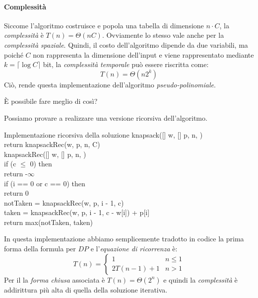 \paragraph{Complessità}
Siccome l'algoritmo costruisce e popola una tabella di dimensione $n\cdot C$,
la \emph{complessità} è $T(n)=\Theta(nC)$. Ovviamente lo stesso vale anche per 
la \emph{complessità spaziale}. Quindi, il costo dell'algoritmo dipende da due
variabili, ma poiché $C$ non rappresenta la dimensione dell'input e viene
rappresentato mediante $k=\lceil\log C\rceil$ bit, la \emph{complessità
temporale} può essere riscritta come:
\[T(n)=\Theta(n2^k)\]
Ciò, rende questa implementazione dell'algoritmo \emph{pseudo-polinomiale}\footnotemark.


\bigskip\noindent
È possibile fare meglio di così?

Possiamo provare a realizzare una versione ricorsiva dell'algoritmo.

\begin{minicode}{Implementazione ricorsiva della soluzione}
\ind{} knapsack([] w, [] p,  n, )\\
    return knapsackRec(w, p, n, C)\\

\ind{} knapsackRec([] w, [] p,  n, )\\
    \indf if (c $\leq$ 0) then\\
        return -$\infty$\\
    \indf if (i == 0 or c == 0) then\\
        return 0\\
    \indf{} notTaken = knapsackRec(w, p, i - 1, c)\\
    \indf{} taken = knapsackRec(w, p, i - 1, c - w[i]) + p[i]\\
    \indf return max(notTaken, taken)
\end{minicode}\noindent
In questa implementazione abbiamo semplicemente tradotto in codice la prima
forma della formula per $DP$ e l'\emph{equazione di ricorrenza} è:
\[T(n)=\begin{cases}
    1 & n\leq1\\
    2T(n-1)+1 & n>1
\end{cases}\]
Per il \emph{} la \emph{forma chiusa} associata è
$T(n)=\Theta(2^n)$ e quindi la \emph{complessità} è addirittura più alta di
quella della soluzione iterativa.

